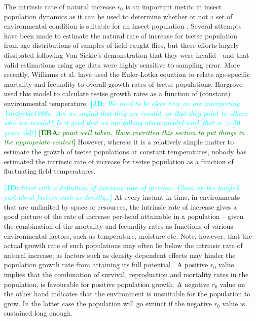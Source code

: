 \documentclass[12pt,a4paper]{article}
\newcommand{\comment}[3]{\textcolor{#1}{\textbf{[#2: }\textsl{#3}\textbf{]}}}
\newcommand{\jd}[1]{\comment{cyan}{JD}{#1}}
\newcommand{\eb}[2]{\comment{green}{EBA}{#1}}
\begin{document}
The intrinsic rate of natural increase $r_0$ is an important metric in insect population dynamics as it can be used to determine whether or not a set of environmental condition is suitable for an insect population \cite{Birch1948}. Several attempts have been made to estimate the natural rate of increase for tsetse population from age distributions of samples of field caught flies, but these efforts largely dissipated following Van Sickle’s \cite{VanSickle1988a} demonstration that they were invalid - and that valid estimations using age data were highly sensitive to sampling error. More recently, Williams et al. \cite{williams1990tsetse} have used the Euler-Lotka equation to relate age-specific mortality and fecundity to overall growth rates of tsetse populations. Hargrove \cite{Hargrove2004a}  used this model to calculate tsetse growth rates as a function of (constant) environmental temperature. \jd{We need to be clear how we are interpreting VanSickle1988a. Are we saying that they are invalid, or that they point to others who are invalid? Is it good that we are talking about invalid work that is $>30$ years old?} \eb{point well taken. Have rewritten this section to put things in the appropriate context}. However, whereas it is a relatively simple matter to estimate the growth of tsetse populations at constant temperatures, nobody has estimated the intrinsic rate of increase for tsetse population as a function of fluctuating field temperatures.

\jd{Start with a definition of intrinsic rate of increase. Clean up the tangled part about factors such as density\ldots} At every instant in time, in environments that are unlimited by space or  resources, the intrinsic rate of increase gives a good picture of the rate of increase per-head  attainable in a population -- given the combination of  the mortality and fecundity rates as functions of various environmental factors, such as temperature, moisture etc. Note, however, that the actual growth rate of such populations may often lie below the intrinsic rate of natural increase, as factors such as density dependent effects may hinder the population growth rate from attaining its full potential \cite{Birch1948}. A positive $r_0$ value implies that the combination of survival, reproduction and  mortality rates in the population, is favourable for positive population growth. A negative $r_0$ value on the other hand indicates that the environment is unsuitable for the population to grow. In the latter case the population will go extinct if the negative $r_0$ value is sustained long enough.
\end{document}
